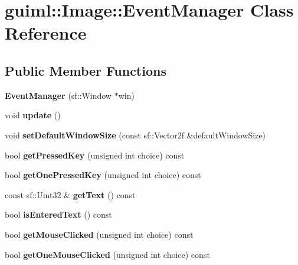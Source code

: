 \section{guiml\-:\-:Image\-:\-:Event\-Manager Class Reference}
\label{classguiml_1_1_image_1_1_event_manager}
\subsection*{Public Member Functions}
\begin{DoxyCompactItemize}
\item 
{\bfseries Event\-Manager} (sf\-::\-Window $\ast$win)\label{classguiml_1_1_image_1_1_event_manager_a92048c24f18a5e33a0c2eb3934b0c84a}

\item 
void {\bfseries update} ()\label{classguiml_1_1_image_1_1_event_manager_ae1eea9ac8fc36440aba77fc20ba22bb9}

\item 
void {\bfseries set\-Default\-Window\-Size} (const sf\-::\-Vector2f \&default\-Window\-Size)\label{classguiml_1_1_image_1_1_event_manager_aed895029890d72816d6873e0f09ba8f7}

\item 
bool {\bfseries get\-Pressed\-Key} (unsigned int choice) const \label{classguiml_1_1_image_1_1_event_manager_a1a0e269db289e33bada690cc3a016d00}

\item 
bool {\bfseries get\-One\-Pressed\-Key} (unsigned int choice) const \label{classguiml_1_1_image_1_1_event_manager_a281fa9f3436f6a05016c6068918a8311}

\item 
const sf\-::\-Uint32 \& {\bfseries get\-Text} () const \label{classguiml_1_1_image_1_1_event_manager_a9c924d54451518814a994901bd7e9437}

\item 
bool {\bfseries is\-Entered\-Text} () const \label{classguiml_1_1_image_1_1_event_manager_a0ca38df4b096750668addef5702adc20}

\item 
bool {\bfseries get\-Mouse\-Clicked} (unsigned int choice) const \label{classguiml_1_1_image_1_1_event_manager_a5aa2a4f76308b3b61eeef741d1e6bc8f}

\item 
bool {\bfseries get\-One\-Mouse\-Clicked} (unsigned int choice) const \label{classguiml_1_1_image_1_1_event_manager_a22eea799bb23a3bc578753a6588b2a46}


\end{DoxyCompactItemize}
